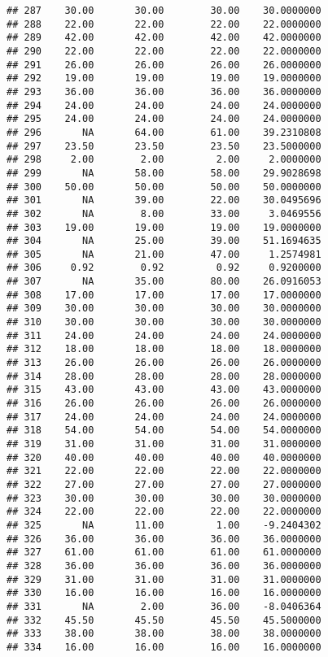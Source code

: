 \documentclass[
]{article}
\begin{document}
\begin{verbatim}
## 287    30.00       30.00        30.00    30.0000000
## 288    22.00       22.00        22.00    22.0000000
## 289    42.00       42.00        42.00    42.0000000
## 290    22.00       22.00        22.00    22.0000000
## 291    26.00       26.00        26.00    26.0000000
## 292    19.00       19.00        19.00    19.0000000
## 293    36.00       36.00        36.00    36.0000000
## 294    24.00       24.00        24.00    24.0000000
## 295    24.00       24.00        24.00    24.0000000
## 296       NA       64.00        61.00    39.2310808
## 297    23.50       23.50        23.50    23.5000000
## 298     2.00        2.00         2.00     2.0000000
## 299       NA       58.00        58.00    29.9028698
## 300    50.00       50.00        50.00    50.0000000
## 301       NA       39.00        22.00    30.0495696
## 302       NA        8.00        33.00     3.0469556
## 303    19.00       19.00        19.00    19.0000000
## 304       NA       25.00        39.00    51.1694635
## 305       NA       21.00        47.00     1.2574981
## 306     0.92        0.92         0.92     0.9200000
## 307       NA       35.00        80.00    26.0916053
## 308    17.00       17.00        17.00    17.0000000
## 309    30.00       30.00        30.00    30.0000000
## 310    30.00       30.00        30.00    30.0000000
## 311    24.00       24.00        24.00    24.0000000
## 312    18.00       18.00        18.00    18.0000000
## 313    26.00       26.00        26.00    26.0000000
## 314    28.00       28.00        28.00    28.0000000
## 315    43.00       43.00        43.00    43.0000000
## 316    26.00       26.00        26.00    26.0000000
## 317    24.00       24.00        24.00    24.0000000
## 318    54.00       54.00        54.00    54.0000000
## 319    31.00       31.00        31.00    31.0000000
## 320    40.00       40.00        40.00    40.0000000
## 321    22.00       22.00        22.00    22.0000000
## 322    27.00       27.00        27.00    27.0000000
## 323    30.00       30.00        30.00    30.0000000
## 324    22.00       22.00        22.00    22.0000000
## 325       NA       11.00         1.00    -9.2404302
## 326    36.00       36.00        36.00    36.0000000
## 327    61.00       61.00        61.00    61.0000000
## 328    36.00       36.00        36.00    36.0000000
## 329    31.00       31.00        31.00    31.0000000
## 330    16.00       16.00        16.00    16.0000000
## 331       NA        2.00        36.00    -8.0406364
## 332    45.50       45.50        45.50    45.5000000
## 333    38.00       38.00        38.00    38.0000000
## 334    16.00       16.00        16.00    16.0000000

\end{verbatim}
\end{document}

